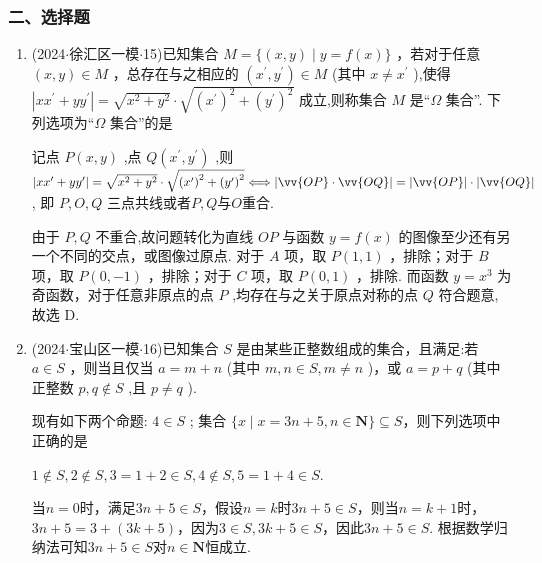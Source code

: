 \subsubsection*{二、选择题}
\begin{enumerate}
    \item (2024$\cdot$徐汇区一模$\cdot$15)已知集合 $M = \{ \left( {x,y}\right)  \mid  y = f\left( x\right) \}$ ，若对于任意 $\left( {x,y}\right)  \in  M$ ，总存在与之相应的 $\left( {{x}^{\prime },{y}^{\prime }}\right)  \in  M$ (其中 $x \neq  {x}^{\prime }$ ),使得 $\left| {x{x}^{\prime } + y{y}^{\prime }}\right|  = \sqrt{{x}^{2} + {y}^{2}} \cdot  \sqrt{{\left( {x}^{\prime }\right) }^{2} + {\left( {y}^{\prime }\right) }^{2}}$ 成立,则称集合 $M$ 是“$\Omega$ 集合”. 下列选项为“$\Omega$ 集合”的是 
    \begin{jieda}
        记点 $P\left( {x,y}\right)$ ,点 $Q\left( {{x}^{\prime },{y}^{\prime }}\right)$ ,则 $\left| {x{x}^{\prime } + y{y}^{\prime }}\right|  = \sqrt{{x}^{2} + {y}^{2}} \cdot  \sqrt{{\left( {x}^{\prime }\right) }^{2} + {\left( {y}^{\prime }\right) }^{2}} \Longleftrightarrow  \left| {\vv{OP} \cdot  \vv{OQ}}\right|  = \left| \vv{OP}\right|  \cdot  \left| \vv{OQ}\right|$, 即 $P,O,Q$ 三点共线或者$P,Q$与$O$重合.
        
        由于 $P,Q$ 不重合,故问题转化为直线 ${OP}$ 与函数 $y = f\left( x\right)$ 的图像至少还有另一个不同的交点，或图像过原点. 对于 ${A}$ 项，取 $P\left( {1,1}\right)$ ，排除；对于 ${B}$ 项，取 $P\left( {0, - 1}\right)$ ，排除；对于 $C$ 项，取 $P\left( {0,1}\right)$ ，排除. 而函数 $y = {x}^{3}$ 为奇函数，对于任意非原点的点 $P$ ,均存在与之关于原点对称的点 $Q$ 符合题意,故选 D.
    \end{jieda}
    
    \item (2024$\cdot$宝山区一模$\cdot$16)已知集合 $S$ 是由某些正整数组成的集合，且满足:若 $a \in  S$ ，则当且仅当 $a = m + n$ (其中 $m,n \in  S,m \neq  n$ )，或 $a = p + q$ (其中正整数 $p,q \notin  S$ ,且 $p \neq  q$ ).
    
    现有如下两个命题:   $4 \in  S$ ;    集合 $\{ x \mid  x = {3n} + 5,n \in  \mathbf{N}\}  \subseteq  S$，则下列选项中正确的是 
    \begin{jieda}
        $1 \notin S, 2 \notin S, 3=1+2 \in S, 4 \notin S, 5 = 1+4 \in S$.

        当$n = 0$时，满足${3n} + 5 \in S$，假设$n = k$时${3n} + 5 \in S$，则当$n = k+1$时，${3n} + 5 = 3 + (3k+5)$，因为$3 \in S, 3k+5 \in S$，因此${3n} + 5 \in S$. 根据数学归纳法可知${3n} + 5 \in S$对$n \in \mathbf{N}$恒成立.
    \end{jieda}
\end{enumerate}

